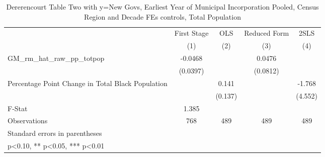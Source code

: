 \begin{table}[htbp]\centering
\def\sym#1{\ifmmode^{#1}\else\(^{#1}\)\fi}
\caption{Dererencourt Table Two with y=New Govs, Earliest Year of Municipal Incorporation  Pooled, Census Region and Decade FEs controls, Total Population}
\begin{tabular}{l*{4}{c}}
\toprule
                    & First Stage   &         OLS   &Reduced Form   &        2SLS   \\
                    &\multicolumn{1}{c}{(1)}   &\multicolumn{1}{c}{(2)}   &\multicolumn{1}{c}{(3)}   &\multicolumn{1}{c}{(4)}   \\
\midrule
GM\_rm\_hat\_raw\_pp\_totpop&     -0.0468   &               &      0.0476   &               \\
                    &    (0.0397)   &               &    (0.0812)   &               \\
\addlinespace
Percentage Point Change in Total Black Population&               &       0.141   &               &      -1.768   \\
                    &               &     (0.137)   &               &     (4.552)   \\
\midrule
F-Stat              &       1.385   &               &               &               \\
Observations        &         768   &         489   &         489   &         489   \\
\bottomrule
\multicolumn{5}{l}{\footnotesize Standard errors in parentheses}\\
\multicolumn{5}{l}{\footnotesize * p<0.10, ** p<0.05, *** p<0.01}\\
\end{tabular}
\end{table}
